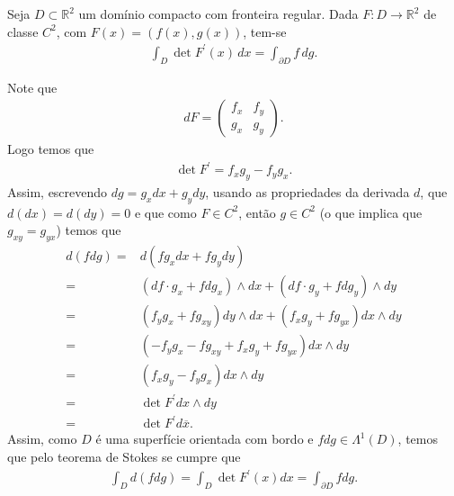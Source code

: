 \begin{homeworkProblem}[Seção 2-10]
  Seja $D\subset\mathbb{R}^{2}$ um domínio compacto com fronteira regular. Dada $F:D\to\mathbb{R}^{2}$ de classe $C^{2}$, com $F(x)=(f(x),g(x))$, tem-se 
  \begin{align*}
    \int_D \det F^{\prime}(x)\,dx=\int_{\partial D} f\,dg.
  \end{align*}
  \begin{solution}
    Note que
    \begin{align*}
      dF=\begin{pmatrix}
        f_{x} & f_{y} \\
        g_{x} & g_{y}
      \end{pmatrix}.
    \end{align*}
    Logo temos que 
    \begin{align*}
      \det F^{\prime}=f_xg_y-f_yg_x.
    \end{align*}
    Assim, escrevendo $dg=g_xdx+g_ydy$, usando as propriedades da derivada $d$, que $d(dx)=d(dy)=0$ e que como $F\in C^{2}$, então $g\in C^{2}$ (o que implica que $g_{xy}=g_{yx}$) temos que
    \begin{align*}
      d(fdg)=&d\left( fg_xdx+fg_ydy \right)\\
      =&\left( df\cdot g_x+fdg_x \right)\wedge dx+\left( df\cdot g_y+fdg_y \right)\wedge dy\\
      =&\left( f_yg_x+fg_{xy} \right)dy \wedge dx+\left( f_xg_y+fg_{yx} \right)dx\wedge dy\\
      =&\left( -f_yg_x-fg_{xy}+f_xg_y+fg_{yx} \right)dx\wedge dy\\
      =&\left( f_xg_y-f_yg_x \right)dx\wedge dy\\
      =&\det F^{\prime}dx\wedge dy\\
      =&\det F^{\prime}d\overline{x}.
    \end{align*}
    Assim, como $D$ é uma superfície orientada com bordo e $fdg\in\Lambda^{1}(D)$, temos que pelo teorema de Stokes se cumpre que
    \begin{align*}
      \int_{D}d(fdg)=\int_{D}\det F^{\prime}(x)dx=\int_{\partial D}fdg.
    \end{align*}
  \end{solution}
\end{homeworkProblem}
